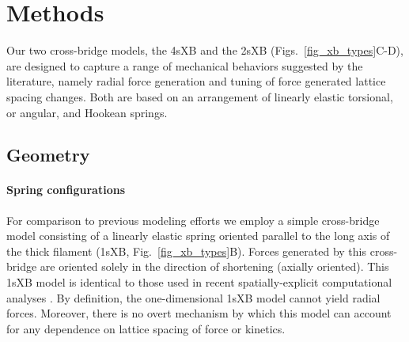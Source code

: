 \documentclass[]{article}
\begin{document}
\section*{Methods}  %

Our two cross-bridge models, the 4sXB and the 2sXB (Figs.~\ref{fig_xb_types}C-D), are designed to capture a range of mechanical behaviors suggested by the literature, namely radial force generation and tuning of force generated lattice spacing changes.  %
Both are based on an arrangement of linearly elastic torsional, or angular, and Hookean springs.  

\subsection*{Geometry} %

\paragraph{Spring configurations} %
For comparison to previous modeling efforts we employ a simple cross-bridge model consisting of a linearly elastic spring oriented parallel to the long axis of the thick filament (1sXB, Fig.~\ref{fig_xb_types}B).  
Forces generated by this cross-bridge are oriented solely in the direction of shortening (axially oriented). 
This 1sXB model is identical to those used in recent spatially-explicit computational analyses \citep{Daniel1998, Chase2004, Tanner2007}. 
By definition, the one-dimensional 1sXB model cannot yield radial forces.  
Moreover, there is no overt mechanism by which this model can account for any dependence on lattice spacing of force or kinetics.
\end{document}
